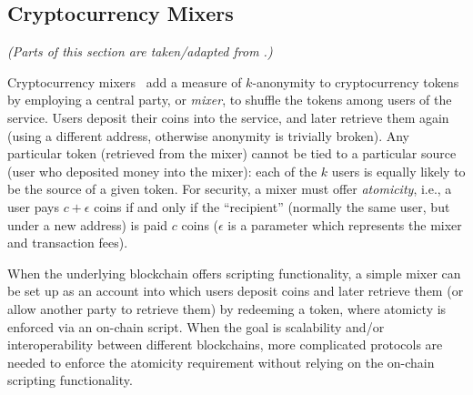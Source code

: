 \subsection{Cryptocurrency Mixers}\label{sec:mixers}

\textit{(Parts of this section are taken/adapted from \cite{CCS:GMMMTT22}.)}


Cryptocurrency mixers~\cite{ESORICS:RufMorKat14,EPRINT:SNBB19,ACSAC:TLKBS18,FC:BNMCKF14,coinjoin,CCS:GreMie17} add a measure of $k$-anonymity to cryptocurrency tokens by employing a central party, or \emph{mixer}, to shuffle the tokens among users of the service. Users deposit their coins into the service, and later retrieve them again (using a different address, otherwise anonymity is trivially broken).
Any particular token (retrieved from the mixer) cannot be tied to a particular source (user who deposited money into the mixer): each of the $k$ users is equally likely to be the source of a given token. For security, a mixer must offer \emph{atomicity}, i.e., a user pays $c+\epsilon$ coins if and only if the ``recipient'' (normally the same user, but under a new address) is paid $c$ coins ($\epsilon$ is a parameter which represents the mixer and transaction fees).

When the underlying blockchain offers scripting functionality, a simple mixer can be set up as an account into which users deposit coins and later retrieve them (or allow another party to retrieve them) by redeeming a token, where atomicty is enforced via an on-chain script. When the goal is scalability and/or interoperability between different blockchains, more complicated protocols are needed to enforce the atomicity requirement without relying on the on-chain scripting functionality. 

